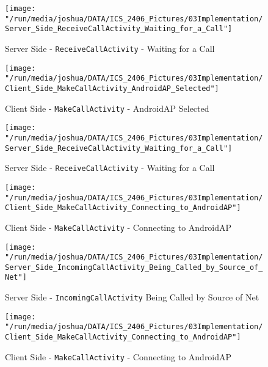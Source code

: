 \documentclass[12pt,svgnames,smaller]{article} %
\begin{document}
		\begin{figure}
			\centering
			\begin{minipage}{.5\textwidth}
				\centering
				\texttt{[image: "/run/media/joshua/DATA/ICS\_2406\_Pictures/03Implementation/Server\_Side\_ReceiveCallActivity\_Waiting\_for\_a\_Call"]}
				\caption{Server Side - \texttt{ReceiveCallActivity} - Waiting for a Call}
				\label{fig:Implementation-Figure7}			
			\end{minipage}%
			\begin{minipage}{0.5\textwidth}
				\centering
				\texttt{[image: "/run/media/joshua/DATA/ICS\_2406\_Pictures/03Implementation/Client\_Side\_MakeCallActivity\_AndroidAP\_Selected"]}
				\caption{Client Side - \texttt{MakeCallActivity} - AndroidAP Selected}
				\label{fig:Implementation-Figure8}
			\end{minipage}
		\end{figure} 		
		
		\begin{figure}
			\centering
			\begin{minipage}{.5\textwidth}
				\centering
				\texttt{[image: "/run/media/joshua/DATA/ICS\_2406\_Pictures/03Implementation/Server\_Side\_ReceiveCallActivity\_Waiting\_for\_a\_Call"]}
				\caption{Server Side - \texttt{ReceiveCallActivity} - Waiting for a Call}
				\label{fig:Implementation-Figure9}			
			\end{minipage}%
			\begin{minipage}{0.5\textwidth}
				\centering
				\texttt{[image: "/run/media/joshua/DATA/ICS\_2406\_Pictures/03Implementation/Client\_Side\_MakeCallActivity\_Connecting\_to\_AndroidAP"]}
				\caption{Client Side - \texttt{MakeCallActivity} - Connecting to AndroidAP}
				\label{fig:Implementation-Figure10}
			\end{minipage}
		\end{figure} 		
		
		\begin{figure}
			\centering
			\begin{minipage}{.5\textwidth}
				\centering
				\texttt{[image: "/run/media/joshua/DATA/ICS\_2406\_Pictures/03Implementation/Server\_Side\_IncomingCallActivity\_Being\_Called\_by\_Source\_of\_Net"]}
				\caption{Server Side - \texttt{IncomingCallActivity} Being Called by Source of Net}
				\label{fig:Implementation-Figure11}			
			\end{minipage}%
			\begin{minipage}{0.5\textwidth}
				\centering
				\texttt{[image: "/run/media/joshua/DATA/ICS\_2406\_Pictures/03Implementation/Client\_Side\_MakeCallActivity\_Connecting\_to\_AndroidAP"]}
				\caption{Client Side - \texttt{MakeCallActivity} - Connecting to AndroidAP}
				\label{fig:Implementation-Figure12}
			\end{minipage}
		\end{figure} 		
		
\end{document}
